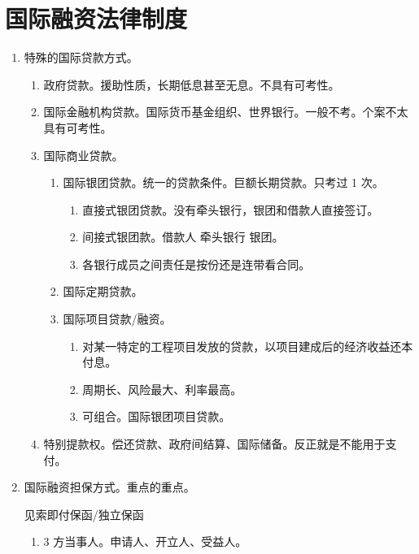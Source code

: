 \section{国际融资法律制度}
\begin{enumerate}
  \item 特殊的国际贷款方式。
        \begin{enumerate}
          \item 政府贷款。援助性质，长期低息甚至无息。不具有可考性。
          \item 国际金融机构贷款。国际货币基金组织、世界银行。一般不考。个案不太具有可考性。
          \item 国际商业贷款。
                \begin{enumerate}
                  \item 国际银团贷款。统一的贷款条件。巨额长期贷款。只考过 1 次。
                        \begin{enumerate}
                          \item 直接式银团贷款。没有牵头银行，银团和借款人直接签订。
                          \item 间接式银团款。借款人 \yjt 牵头银行 \yjt 银团。
                          \item 各银行成员之间责任是按份还是连带看合同。
                        \end{enumerate}
                  \item 国际定期贷款。
                  \item 国际项目贷款/融资。
                        \begin{enumerate}
                          \item 对某一特定的工程项目发放的贷款，以项目建成后的经济收益还本付息。
                          \item 周期长、风险最大、利率最高。
                          \item 可组合。国际银团项目贷款。
                        \end{enumerate}
                \end{enumerate}
          \item 特别提款权。偿还贷款、政府间结算、国际储备。反正就是不能用于支付。
        \end{enumerate}
  \item 国际融资担保方式。重点的重点。
        \begin{kk}{见索即付保函/独立保函}
          \begin{enumerate}
            \item 3 方当事人。申请人、开立人、受益人。

\end{enumerate}
\end{kk}
\end{enumerate}
